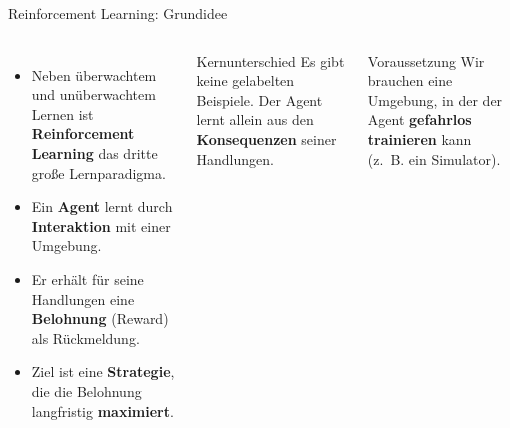 
\begin{frame}{Reinforcement Learning: Grundidee}
\begin{columns}
\begin{itemize}
  \item Neben überwachtem und unüberwachtem Lernen ist \textbf{Reinforcement
        Learning} das dritte große Lernparadigma.
  \item Ein \textbf{Agent} lernt durch \textbf{Interaktion} mit einer
        Umgebung.
  \item Er erhält für seine Handlungen eine \textbf{Belohnung} (Reward) als
        Rückmeldung.
  \item Ziel ist eine \textbf{Strategie}, die die Belohnung langfristig
        \textbf{maximiert}.
\end{itemize}

\begin{blockC1}{Kernunterschied}
Es gibt keine gelabelten Beispiele. Der Agent lernt allein aus den
\textbf{Konsequenzen} seiner Handlungen.
\end{blockC1}


\begin{blockC2}{Voraussetzung}
Wir brauchen eine Umgebung, in der der Agent \textbf{gefahrlos trainieren} kann  (z.~B. ein Simulator).
\end{blockC2}



\end{columns}
\end{frame}

